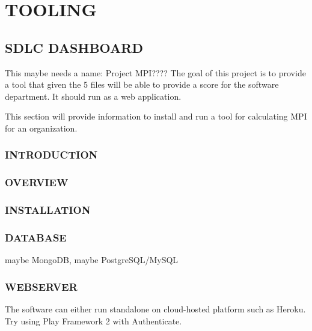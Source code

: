 \documentclass[SDSUThesis.tex]{subfiles}
\begin{document}
\section{TOOLING}


\subsection{SDLC DASHBOARD}
This maybe needs a name: Project MPI????  The goal of this project is to provide a tool that
given the 5 files will be able to provide a score for the software department.  It should run 
as a web application.

This section will provide information to install and run a tool for calculating MPI for an organization.
\subsubsection{INTRODUCTION}
\subsubsection{OVERVIEW}
\subsubsection{INSTALLATION}
\subsubsection{DATABASE}
maybe MongoDB, maybe PostgreSQL/MySQL
\subsubsection{WEBSERVER}
The software can either run standalone on cloud-hosted platform such as Heroku.  Try using Play Framework 2 with Authenticate.
\end{document}
